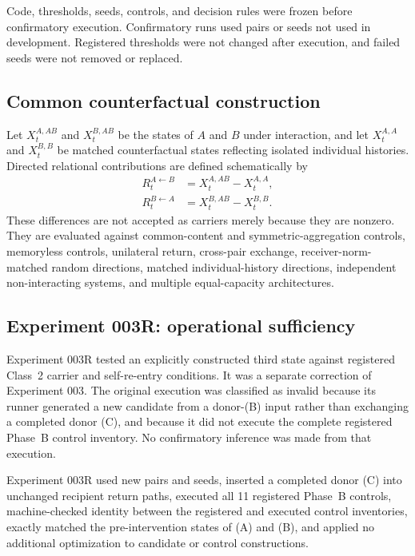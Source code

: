 \documentclass[11pt,a4paper]{article}
\begin{document}
Code, thresholds, seeds, controls, and decision rules were frozen before confirmatory execution. Confirmatory runs used pairs or seeds not used in development. Registered thresholds were not changed after execution, and failed seeds were not removed or replaced.

\subsection{Common counterfactual construction}

Let $X^{A,AB}_t$ and $X^{B,AB}_t$ be the states of $A$ and $B$ under interaction, and let $X^{A,A}_t$ and $X^{B,B}_t$ be matched counterfactual states reflecting isolated individual histories. Directed relational contributions are defined schematically by
\begin{align}
 R^{A\leftarrow B}_t &= X^{A,AB}_t-X^{A,A}_t,\\
 R^{B\leftarrow A}_t &= X^{B,AB}_t-X^{B,B}_t.
 \label{eq:directed}
\end{align}
These differences are not accepted as carriers merely because they are nonzero. They are evaluated against common-content and symmetric-aggregation controls, memoryless controls, unilateral return, cross-pair exchange, receiver-norm-matched random directions, matched individual-history directions, independent non-interacting systems, and multiple equal-capacity architectures.

\subsection{Experiment 003R: operational sufficiency}

Experiment 003R tested an explicitly constructed third state against registered Class~2 carrier and self-re-entry conditions. It was a separate correction of Experiment 003. The original execution was classified as invalid because its runner generated a new candidate from a donor-(B) input rather than exchanging a completed donor (C), and because it did not execute the complete registered Phase~B control inventory. No confirmatory inference was made from that execution.

Experiment 003R used new pairs and seeds, inserted a completed donor (C) into unchanged recipient return paths, executed all 11 registered Phase~B controls, machine-checked identity between the registered and executed control inventories, exactly matched the pre-intervention states of (A) and (B), and applied no additional optimization to candidate or control constructions.
\end{document}
